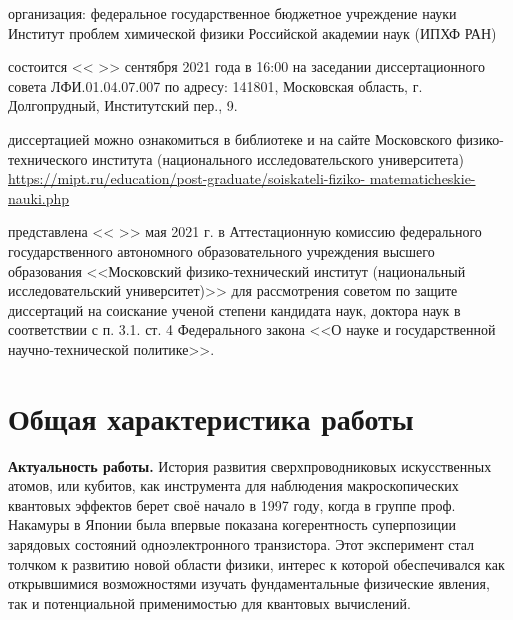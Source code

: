 \documentclass[14pt, a4paper]{extarticle}
\begin{document}
\vspace{1.5cm}
 организация: федеральное государственное бюджетное учреждение науки Институт проблем химической физики Российской академии наук (ИПХФ РАН)

\vspace{1.5cm}
 состоится << >> сентября 2021 года в 16:00 на заседании диссертационного совета ЛФИ.01.04.07.007 по адресу: 141801, Московская область, г. Долгопрудный, Институтский пер., 9.

\vspace{1.5cm}
 диссертацией можно ознакомиться в библиотеке и на сайте Московского физико-технического института (национального исследовательского университета) \url{https://mipt.ru/education/post-graduate/soiskateli-fiziko- matematicheskie-nauki.php}

\vspace{1.5cm}
 представлена << >> мая 2021 г. в Аттестационную комиссию федерального государственного автономного образовательного учреждения высшего образования <<Московский физико-технический институт (национальный исследовательский университет)>> для рассмотрения советом по защите диссертаций на соискание ученой степени кандидата наук, доктора наук в соответствии с п. 3.1. ст. 4 Федерального закона <<О науке и государственной научно-технической политике>>.

\section*{Общая характеристика работы}

\textbf{Актуальность работы.} История развития сверхпроводниковых искусственных атомов, или кубитов, как инструмента для наблюдения макроскопических квантовых эффектов берет своё начало в 1997 году, когда в группе проф. Накамуры в Японии была впервые показана \cite{nakamura1997spectroscopy} когерентность суперпозиции зарядовых состояний одноэлектронного транзистора. Этот эксперимент стал толчком к развитию новой области физики, интерес к которой обеспечивался как открывшимися возможностями изучать фундаментальные физические явления, так и потенциальной применимостью для квантовых вычислений.
\end{document}
